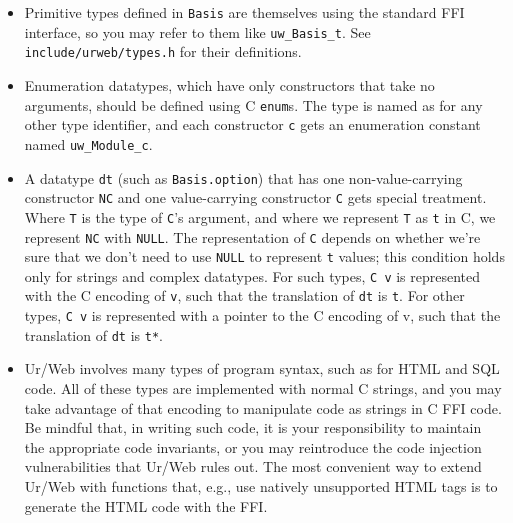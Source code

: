 \documentclass{article}
\begin{document}
\begin{itemize}
  \item Primitive types defined in \texttt{Basis} are themselves using the standard FFI interface, so you may refer to them like \texttt{uw\_Basis\_t}.  See \texttt{include/urweb/types.h} for their definitions.
  \item Enumeration datatypes, which have only constructors that take no arguments, should be defined using C \texttt{enum}s.  The type is named as for any other type identifier, and each constructor \texttt{c} gets an enumeration constant named \texttt{uw\_Module\_c}.
  \item A datatype \texttt{dt} (such as \texttt{Basis.option}) that has one non-value-carrying constructor \texttt{NC} and one value-carrying constructor \texttt{C} gets special treatment.  Where \texttt{T} is the type of \texttt{C}'s argument, and where we represent \texttt{T} as \texttt{t} in C, we represent \texttt{NC} with \texttt{NULL}.  The representation of \texttt{C} depends on whether we're sure that we don't need to use \texttt{NULL} to represent \texttt{t} values; this condition holds only for strings and complex datatypes.  For such types, \texttt{C v} is represented with the C encoding of \texttt{v}, such that the translation of \texttt{dt} is \texttt{t}.  For other types, \texttt{C v} is represented with a pointer to the C encoding of v, such that the translation of \texttt{dt} is \texttt{t*}.
  \item Ur/Web involves many types of program syntax, such as for HTML and SQL code.  All of these types are implemented with normal C strings, and you may take advantage of that encoding to manipulate code as strings in C FFI code.  Be mindful that, in writing such code, it is your responsibility to maintain the appropriate code invariants, or you may reintroduce the code injection vulnerabilities that Ur/Web rules out.  The most convenient way to extend Ur/Web with functions that, e.g., use natively unsupported HTML tags is to generate the HTML code with the FFI.
\end{itemize}
\end{document}
